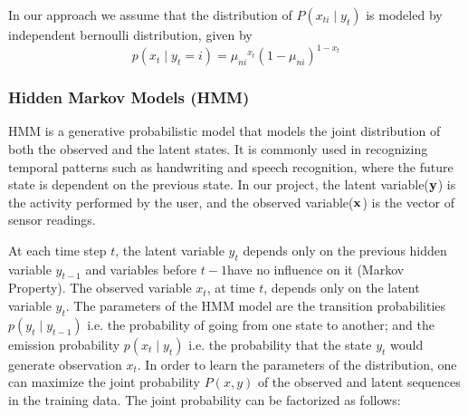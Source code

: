 \documentclass[11pt, oneside]{article}   	%
\begin{document}
In our approach we assume that the distribution of $P(x_{ti} \mid y_t)$ is modeled by independent bernoulli distribution, given by
\begin{equation}
p({{x}_{t} \mid {y}_{t} = i})={{\mu}_{ni}}^{{{x}_{t}}}{(1-{\mu}_{ni})}^{1-{{x}_{t}}}
\end{equation}

%

\subsubsection{Hidden Markov Models (HMM)}
HMM is a generative probabilistic model that models the joint distribution of both the observed and the latent states. It is commonly used in recognizing temporal patterns such as handwriting and speech recognition, where the future state is dependent on the previous state.  In our project, the latent variable($\bf{y}$) is the activity performed by the user, and the observed variable($\bf{x}$) is the vector of sensor readings. 

At each time step $t$, the latent variable $y_t$ depends only on the previous hidden variable $y_{t-1}$ and variables before $t-1$have no influence on it (Markov Property). The observed variable $x_t$, at time $t$, depends only on the latent variable $y_t$. The parameters of the HMM model are the transition probabilities $p(y_{t}\mid y_{t-1})$ i.e.  the probability of going from one state to another; and the emission probability $p(x_{t}\mid y_{t})$ i.e. the probability that the state $y_t$ would generate observation $x_{t}$. In order to learn the parameters of the distribution, one can maximize the joint probability $P(x,y)$ of the observed and latent sequences in the training data. The joint probability can be factorized as follows:
\end{document}
